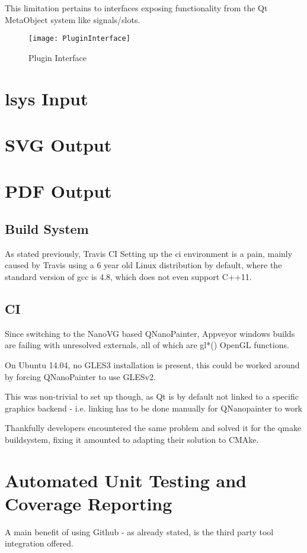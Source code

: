 This limitation pertains to interfaces exposing functionality from the Qt MetaObject system like signals/slots.

\begin{figure}[htb]
	\texttt{[image: PluginInterface]}
	\caption{Plugin Interface}
	\label{fig:plugint}
\end{figure}

\section{\gls{lsys} Input}
\label{sec:lsys}
\section{SVG Output}
\label{sec:svg}

\section{PDF Output}
\label{sec:pdf}


\subsection{Build System}
As stated previously, Travis CI
Setting up the \gls{ci} environment is a pain, mainly caused by Travis using a 6 year old Linux distribution by default, where the standard version of gcc is 4.8, which does not even support C++11.

\subsection{CI}
Since switching to the NanoVG based QNanoPainter, Appveyor windows builds are failing with unresolved externals, all of which are gl*() OpenGL functions.


On Ubuntu 14.04, no GLES3 installation is present, this could be worked around by forcing QNanoPainter to use GLESv2.

This was non-trivial to set up though, as Qt is by default not linked to a specific graphics backend - i.e. linking has to be done manually for QNanopainter to work

Thankfully developers encountered the same problem and solved it for the qmake buildsystem, fixing it amounted to adapting their solution to CMAke.

\section{Automated Unit Testing and Coverage Reporting}
A main benefit of using Github - as already stated, is the third party tool integration offered.

